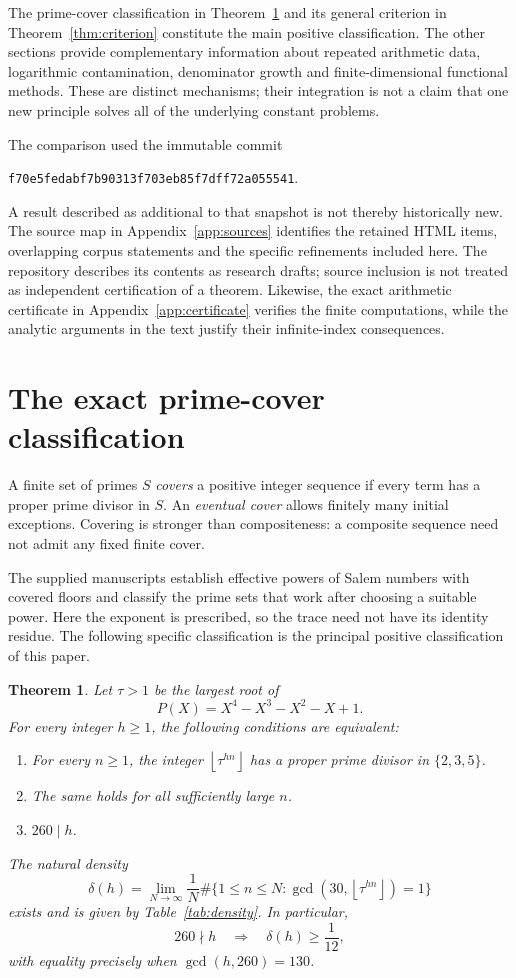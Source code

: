 \documentclass[11pt,a4paper]{article}
\newtheorem{theorem}{Theorem}[section]
\theoremstyle{definition}\newtheorem{definition}[theorem]{Definition}
\theoremstyle{remark}\newtheorem{remark}[theorem]{Remark}
\newcommand{\floor}[1]{\left\lfloor#1\right\rfloor}
\begin{document}
The prime-cover classification in
Theorem~\ref{thm:main} and its general criterion in
Theorem~\ref{thm:criterion} constitute the main positive classification.
The other sections provide complementary information about repeated
arithmetic data, logarithmic contamination, denominator growth and
finite-dimensional functional methods. These are distinct mechanisms;
their integration is not a claim that one new principle solves all of
the underlying constant problems.

The comparison used the immutable commit
\begin{center}
\small\texttt{f70e5fedabf7b90313f703eb85f7dff72a055541}.
\end{center}
A result described as additional to that snapshot is not thereby
historically new. The source map in Appendix~\ref{app:sources} identifies
the retained HTML items, overlapping corpus statements and the
specific refinements included here. The repository describes its
contents as research drafts; source inclusion is not treated as
independent certification of a theorem. Likewise, the exact arithmetic
certificate in Appendix~\ref{app:certificate} verifies the finite
computations, while the analytic arguments in the text justify their
infinite-index consequences.
\section{The exact prime-cover classification}\label{sal:main-section}
A finite set of primes $S$ \emph{covers} a positive integer sequence if every term has a proper prime divisor in $S$. An \emph{eventual cover} allows finitely many initial exceptions. Covering is stronger than compositeness: a composite sequence need not admit any fixed finite cover.

The supplied manuscripts \cite{Corpus005,Corpus031} establish effective powers of Salem numbers with covered floors and classify the prime sets that work after choosing a suitable power. Here the exponent is prescribed, so the trace need not have its identity residue. The following specific classification is the principal positive classification of this paper.

\begin{theorem}\label{thm:main}
Let $\tau>1$ be the largest root of
\[
 P(X)=X^4-X^3-X^2-X+1.
\]
For every integer $h\ge1$, the following conditions are equivalent:
\begin{enumerate}
\item For every $n\ge1$, the integer $\floor{\tau^{hn}}$ has a proper prime divisor in $\{2,3,5\}$.
\item The same holds for all sufficiently large $n$.
\item $260\mid h$.
\end{enumerate}
The natural density
\[
 \delta(h)=\lim_{N\to\infty}\frac1N
 \#\{1\le n\le N:\gcd(30,\floor{\tau^{hn}})=1\}
\]
exists and is given by Table~\ref{tab:density}. In particular,
\[
 260\nmid h\quad\Longrightarrow\quad\delta(h)\ge\frac1{12},
\]
with equality precisely when $\gcd(h,260)=130$.
\end{theorem}
\end{document}
